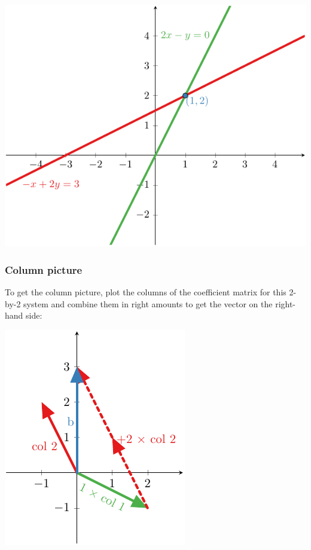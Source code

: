 \documentclass[../main.tex]{subfiles}
\begin{document}
\begingroup
\centering
\includegraphics[width = \columnwidth]{../figures/fig01_2d-row-pic/figure}
\par
\endgroup

\subsubsection{Column picture}
To get the column picture, plot the columns of the coefficient matrix for this 2-by-2 system and combine them in right amounts to get the vector on the right-hand side:

\begingroup
\centering
\includegraphics[width = 0.6\columnwidth]{../figures/fig02_2d-col-pic/figure}
\par
\endgroup
\end{document}
